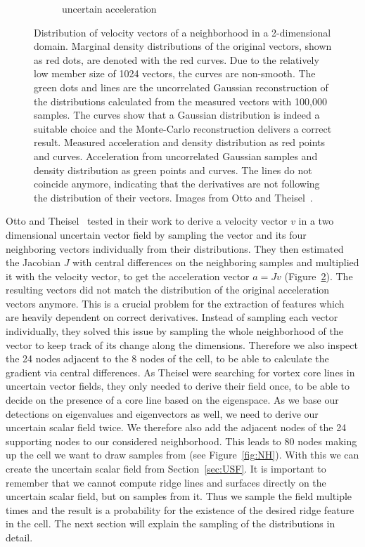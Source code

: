 \begin{figure}[t]
\begin{subfigure}{0.49\textwidth}
        \caption{uncertain acceleration}
        \label{fig:uncacc}
    \end{subfigure}
    \caption{ Distribution of velocity vectors of a
    neighborhood in a 2-dimensional domain. Marginal density
    distributions of the original vectors, shown as red dots, are
    denoted with the red curves. Due to the relatively low member size
    of 1024 vectors, the curves are non-smooth. The green dots and lines
    are the uncorrelated Gaussian reconstruction of the distributions
    calculated from the measured vectors with 100,000 samples. The
    curves show that a Gaussian distribution is indeed a suitable
    choice and the Monte-Carlo reconstruction delivers a correct result.
     Measured acceleration and density distribution
    as red points and curves. Acceleration from uncorrelated Gaussian
    samples and density distribution as green points and curves. The lines
    do not coincide anymore, indicating that the derivatives are not
    following the distribution of their vectors. Images from Otto and
    Theisel~\cite{Vortex}.}
    \label{fig:Theisel}
\end{figure}
\indent Otto and Theisel~\cite{Vortex} tested in their work to derive a
velocity vector $v$ in a two dimensional uncertain vector field by
sampling the vector and its four neighboring vectors individually from
their distributions. They then estimated the Jacobian $J$ with central
differences on the neighboring samples and multiplied it with the
velocity vector, to get the acceleration vector $a = J v$
(Figure~\ref{fig:Theisel}). The resulting vectors did not match the
distribution of the original acceleration vectors anymore. This is a
crucial problem for the extraction of features which are heavily
dependent on correct derivatives. Instead of sampling each vector
individually, they solved this issue by sampling the whole neighborhood
of the vector to keep track of its change along the dimensions.
Therefore we also inspect the 24 nodes adjacent to the 8 nodes of the
cell, to be able to calculate the gradient via central differences. As
Theisel \etal{} were searching for vortex core lines in uncertain vector
fields, they only needed to derive their field once, to be able to
decide on the presence of a core line based on the eigenspace. As we
base our detections on eigenvalues and eigenvectors as well, we need to
derive our uncertain scalar field twice. We therefore also add the
adjacent nodes of the 24 supporting nodes to our considered
neighborhood. This leads to 80 nodes making up the cell we want to draw
samples from (see Figure~\ref{fig:NH}). With this we can create the
uncertain scalar field from Section~\ref{sec:USF}. It is important to
remember that we cannot compute ridge lines and surfaces directly on the
uncertain scalar field, but on samples from it. Thus we sample the field
multiple times and the result is a probability for the existence of the
desired ridge feature in the cell. The next section will explain the
sampling of the distributions in detail.

